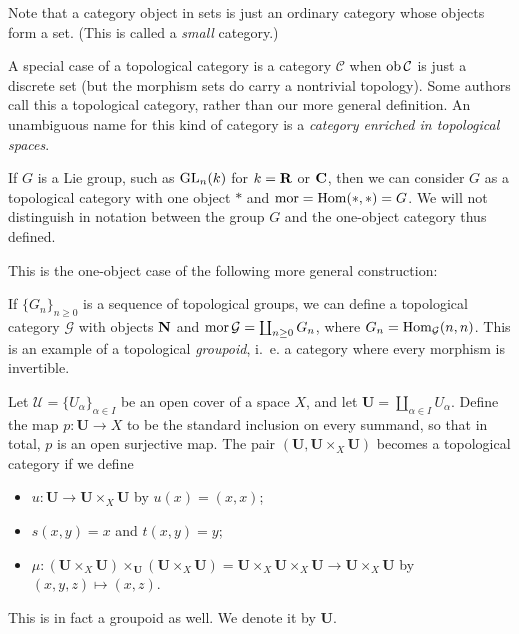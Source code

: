 \documentclass[a4paper,openany]{scrbook}
\renewcommand{\C}{\mathcal C}
\begin{document}
Note that a category object in sets is just an ordinary category whose objects form a set. (This is called a \emph{small} category.)

A special case of a topological category is a category $\C$ when $\ob\C$ is just a discrete set (but the morphism sets do carry a nontrivial topology). Some authors call this a topological category, rather than our more general definition. An unambiguous name for this kind of category is a \emph{category enriched in topological spaces}.

\begin{example}
If $G$ is a Lie group, such as $\operatorname{GL}_n(k)$ for $k=\mathbf R$ or $\mathbf C$, then we can consider $G$ as a topological category with one object $*$ and $\operatorname{mor} = \operatorname{Hom}(*,*) = G$. We will not distinguish in notation between the group $G$ and the one-object category thus defined.
\end{example}

This is the one-object case of the following more general construction:

\begin{example}
If $\{G_n\}_{n \geq 0}$ is a sequence of topological groups, we can define a topological category $\mathcal G$ with objects $\mathbf{N}$ and $\operatorname{mor} \mathcal G = \coprod_{n \geq 0} G_n$, where $G_n = \operatorname{Hom}_{\mathcal G}(n,n)$. This is an example of a topological \emph{groupoid}, i.~e. a category where every morphism is invertible. 
\end{example}

\begin{example} \label{exa:covergroupoid}
Let $\mathcal U = \{U_\alpha\}_{\alpha \in I}$ be an open cover of a space $X$, and let $\mathbf U = \coprod_{\alpha \in I} U_\alpha$. Define the map $p\colon \mathbf U \to X$ to be the standard inclusion on every summand, so that in total, $p$ is an open surjective map.
The pair $(\mathbf U,\mathbf U \times_X \mathbf U)$ becomes a topological category if we define
\begin{itemize}
\item $u\colon \mathbf U \to \mathbf U \times_X \mathbf U$ by $u(x) = (x,x)$;
\item $s(x,y) = x$ and $t(x,y) = y$;
\item $\mu\colon (\mathbf U \times_X \mathbf U) \times_{\mathbf U} (\mathbf U \times_X \mathbf U) = \mathbf U \times_X \mathbf U \times_X \mathbf U \to \mathbf U \times_X \mathbf U$ by $(x,y,z) \mapsto (x,z)$.
\end{itemize}
This is in fact a groupoid as well. We denote it by $\mathbf U$.
\end{example}
\end{document}
